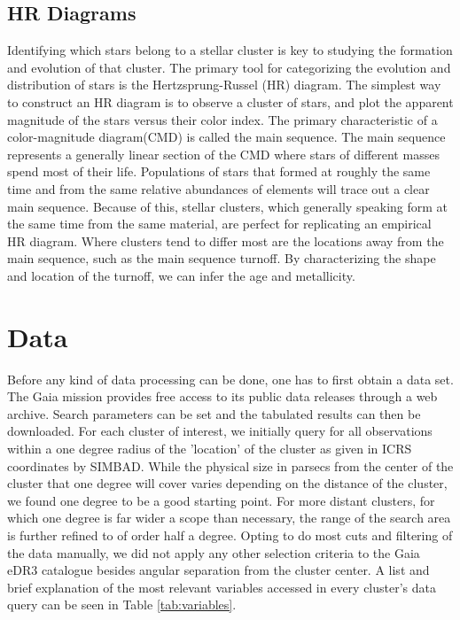 \documentclass[onecolumn,table,xcdraw,super]{aastex631}
\begin{document}
\subsection{HR Diagrams} \label{sec:hr}

Identifying which stars belong to a stellar cluster is key to studying the formation and evolution of that cluster. The primary tool for categorizing the evolution and distribution of stars is the Hertzsprung-Russel (HR) diagram. The simplest way to construct an HR diagram is to observe a cluster of stars, and plot the apparent magnitude of the stars versus their color index. The primary characteristic of a color-magnitude diagram(CMD) is called the main sequence. The main sequence represents a generally linear section of the CMD where stars of different masses spend most of their life. Populations of stars that formed at roughly the same time and from the same relative abundances of elements will trace out a clear main sequence. Because of this, stellar clusters, which generally speaking form at the same time from the same material, are perfect for replicating an empirical HR diagram. Where clusters tend to differ most are the locations away from the main sequence, such as the main sequence turnoff. By characterizing the shape and location of the turnoff, we can infer the age and metallicity.

\section{Data} \label{sec:data}

Before any kind of data processing can be done, one has to first obtain a data set. The Gaia mission provides free access to its public data releases through a web archive. Search parameters can be set and the tabulated results can then be downloaded. For each cluster of interest, we initially query for all observations within a one degree radius of the 'location' of the cluster as given in ICRS coordinates by SIMBAD. While the physical size in parsecs from the center of the cluster that one degree will cover varies depending on the distance of the cluster, we found one degree to be a good starting point. For more distant clusters, for which one degree is far wider a scope than necessary, the range of the search area is further refined to of order half a degree. Opting to do most cuts and filtering of the data manually, we did not apply any other selection criteria to the Gaia eDR3 catalogue besides angular separation from the cluster center. A list and brief explanation of the most relevant variables accessed in every cluster's data query can be seen in Table \ref{tab:variables}.
\end{document}
